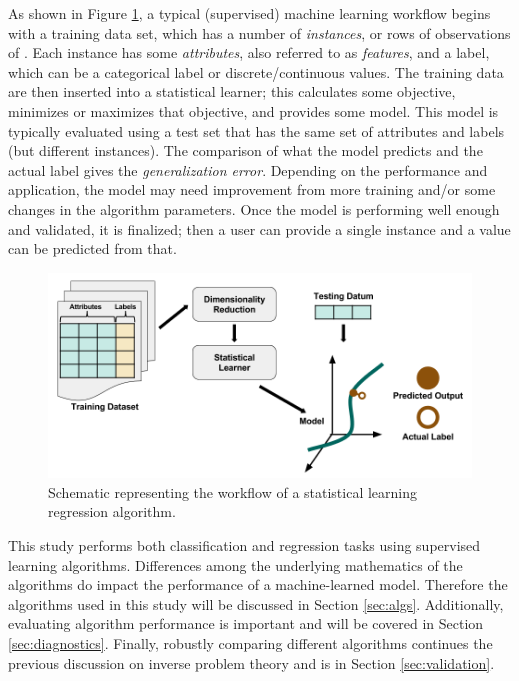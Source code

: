 As shown in Figure \ref{fig:supervised}, a typical (supervised) machine
learning workflow begins with a training data set, which has a number of
\textit{instances}, or rows of observations of .  Each instance has some
\textit{attributes}, also referred to as \textit{features}, and a label, which
can be a categorical label or discrete/continuous values.  The training data
are then inserted into a statistical learner; this calculates some objective,
minimizes or maximizes that objective, and provides some model. This model is
typically evaluated using a test set that has the same set of attributes and
labels (but different instances). The comparison of what the model predicts and
the actual label gives the \textit{generalization error}. Depending on the
performance and application, the model may need improvement from more training
and/or some changes in the algorithm parameters. Once the model is performing
well enough and validated, it is finalized; then a user can provide a single
instance and a value can be predicted from that. 

\begin{figure}[!htb]
  \includegraphics[width=\linewidth]{./chapters/intro/SupervisedRegression.png}
  \caption{Schematic representing the workflow of a statistical learning regression algorithm.}
  \label{fig:supervised}
\end{figure}

This study performs both classification and regression tasks using supervised
learning algorithms.  Differences among the underlying mathematics  of the algorithms do impact the performance of a machine-learned model.
Therefore the algorithms used in this study will be discussed in Section
\ref{sec:algs}. Additionally, evaluating algorithm performance is important and
will be covered in Section \ref{sec:diagnostics}. Finally, robustly comparing
different algorithms continues the previous discussion on inverse problem
theory and is in Section \ref{sec:validation}.

